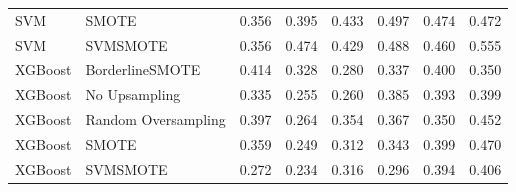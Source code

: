 \begin{tabular}{llllllll}
                         SVM &               SMOTE & 0.356 &                     0.395 &                 0.433 &                  0.497 &                                   0.474 &    0.472 \\
                         SVM &            SVMSMOTE & 0.356 &                     0.474 &                 0.429 &                  0.488 &                                   0.460 &    0.555 \\
                     XGBoost &     BorderlineSMOTE & 0.414 &                     0.328 &                 0.280 &                  0.337 &                                   0.400 &    0.350 \\
                     XGBoost &       No Upsampling & 0.335 &                     0.255 &                 0.260 &                  0.385 &                                   0.393 &    0.399 \\
                     XGBoost & Random Oversampling & 0.397 &                     0.264 &                 0.354 &                  0.367 &                                   0.350 &    0.452 \\
                     XGBoost &               SMOTE & 0.359 &                     0.249 &                 0.312 &                  0.343 &                                   0.399 &    0.470 \\
                     XGBoost &            SVMSMOTE & 0.272 &                     0.234 &                 0.316 &                  0.296 &                                   0.394 &    0.406 \\
\bottomrule
\end{tabular}
